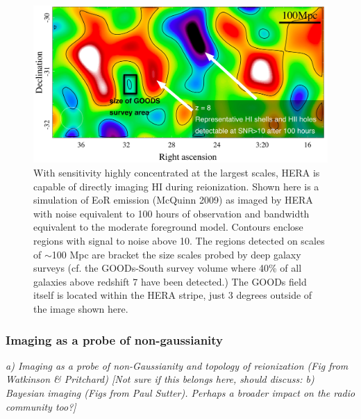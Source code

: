 \documentclass[preprint]{aastex}
\begin{document}
 
\begin{figure}[t]\centering
\includegraphics[width=\textwidth]{plots/Imaging/HERA_331_z8_SNR_annotated.jpg}
\caption{\small
With sensitivity highly concentrated at the largest scales, HERA is capable of directly imaging HI during reionization.  Shown here is a simulation of EoR emission (McQuinn 2009) as imaged by HERA with noise equivalent to 100 hours of observation and bandwidth equivalent to the moderate foreground model. %
Contours enclose regions with signal to noise above 10.  The regions detected on scales of $\sim$100 Mpc are bracket the size scales probed by deep galaxy surveys (cf. the GOODs-South survey volume where 40\% of all galaxies above redshift 7 have been detected.)  The GOODs field itself is located within the HERA stripe, just 3 degrees outside of the image shown here.
\label{fig:imaging}}
\end{figure}    

\subsubsection{Imaging as a probe of non-gaussianity}
\emph{a) Imaging as a probe of non-Gaussianity and topology of reionization (Fig from Watkinson \& Pritchard)
[Not sure if this belongs here, should discuss: b) Bayesian imaging (Figs from Paul Sutter).  
Perhaps a broader impact on the radio community too?]}
\end{document}
